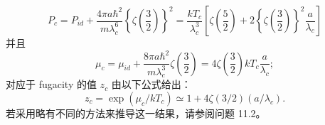 \begin{equation}\tag{11.2.16}\label{eq:11.2.16}
P _ { c } = P _ { i d } + \frac { 4 \pi a \hbar ^{2} } { m \lambda _ { c } ^{6} } \left\{ \zeta \left( \frac { 3 } { 2 } \right) \right\} ^{2} = \frac { k T _ { c } } { \lambda _ { c } ^{3} } \left[ \zeta \left( \frac { 5 } { 2 } \right) + 2 \left\{ \zeta \left( \frac { 3 } { 2 } \right) \right\} ^{2} \frac { a } { \lambda _ { c } } \right]
\end{equation}
并且
\begin{equation}\tag{11.2.17}\label{eq:11.2.17}
\mu _ { c } = \mu _ { i d } + \frac { 8 \pi a \hbar ^{2} } { m \lambda _ { c } ^{3} } \zeta \left( \frac { 3 } { 2 } \right) = 4 \zeta \left( \frac { 3 } { 2 } \right) k T _ { c } \frac { a } { \lambda _ { c } } ;
\end{equation}
对应于 fugacity 的值 \(z_{c}\) 由以下公式给出：
\begin{equation}\tag{11.2.18}\label{eq:11.2.18}
z _ { c } = \exp ( \mu _ { c } / k T _ { c } ) \simeq 1 + 4 \zeta ( 3 / 2 ) ( a / \lambda _ { c } ) .
\end{equation}
若采用略有不同的方法来推导这一结果，请参阅问题 11.2。
